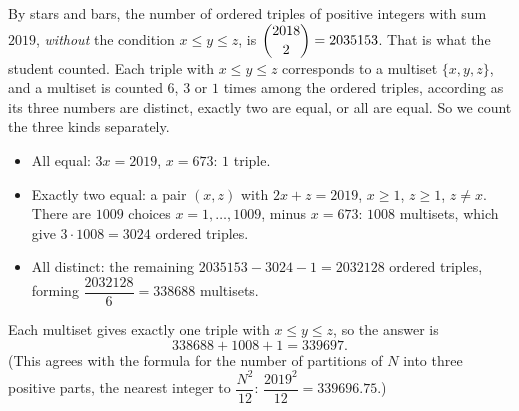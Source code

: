 By stars and bars, the number of ordered triples of positive integers with sum $2019$, \emph{without} the condition $x\le y\le z$, is $\dbinom{2018}{2}=2035153$. That is what the student counted. Each triple with $x\le y\le z$ corresponds to a multiset $\{x,y,z\}$, and a multiset is counted $6$, $3$ or $1$ times among the ordered triples, according as its three numbers are distinct, exactly two are equal, or all are equal. So we count the three kinds separately.
\begin{itemize}
\item All equal: $3x=2019$, $x=673$: $1$ triple.
\item Exactly two equal: a pair $(x,z)$ with $2x+z=2019$, $x\ge1$, $z\ge1$, $z\ne x$. There are $1009$ choices $x=1,\dots,1009$, minus $x=673$: $1008$ multisets, which give $3\cdot1008=3024$ ordered triples.
\item All distinct: the remaining $2035153-3024-1=2032128$ ordered triples, forming $\dfrac{2032128}{6}=338688$ multisets.
\end{itemize}
Each multiset gives exactly one triple with $x\le y\le z$, so the answer is
\[338688+1008+1=\boxed{339697}.\]
(This agrees with the formula for the number of partitions of $N$ into three positive parts, the nearest integer to $\dfrac{N^2}{12}$: $\dfrac{2019^2}{12}=339696.75$.)
